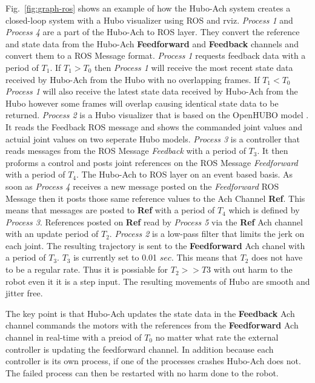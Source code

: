 Fig.~\ref{fig:graph-ros} shows an example of how the Hubo-Ach system creates a closed-loop system with a Hubo visualizer using ROS and rviz.
\textit{Process 1} and \textit{Process 4} are a part of the Hubo-Ach to ROS layer.
They convert the reference and state data from the Hubo-Ach \textbf{Feedforward} and \textbf{Feedback} channels and convert them to a ROS Message format.
\textit{Process 1} requests feedback data with a period of $T_1$.
If $T_1>T_0$ then \textit{Process 1} will receive the most recent state data received by Hubo-Ach from the Hubo with no overlapping frames.
If $T_1<T_0$ \textit{Process 1} will also receive the latest state data received by Hubo-Ach from the Hubo however some frames will overlap causing identical state data to be returned.
\textit{Process 2} is a Hubo visualizer that is based on the OpenHUBO model \cite{jaemiHuboSRM}.
It reads the Feedback ROS message and shows the commanded joint values and actuial joint values on two seperate Hubo models.
\textit{Process 3} is a controller that reads messages from the ROS Message \textit{Feedback} with a period of $T_3$.
It then proforms a control and posts joint references on the ROS Message \textit{Feedforward} with a period of $T_4$.
The Hubo-Ach to ROS layer on an event based basis. 
As soon as \textit{Process 4} receives a new message posted on the \textit{Feedforward} ROS Message then it posts those same reference values to the Ach Channel \textbf{Ref}.
This means that messages are posted to \textbf{Ref} with a period of $T_4$ which is defined by \textit{Process 3}.
References posted on \textbf{Ref} read by \textit{Process 5} via the \textbf{Ref} Ach channel with an update period of $T_2$.
\textit{Process 2} is a low-pass filter that limits the jerk on each joint.
The resulting trajectory is sent to the \textbf{Feedforward} Ach chanel with a period of $T_3$.
$T_3$ is currently set to 0.01 $sec$.
This means that $T_2$ does not have to be a regular rate.
Thus it is possiable for $T_2>>T3$ with out harm to the robot even it it is a step input.
The resulting movements of Hubo are smooth and jitter free.

The key point is that Hubo-Ach updates the state data in the \textbf{Feedback} Ach channel commands the motors with the references from the \textbf{Feedforward} Ach channel in real-time with a preiod of $T_0$ no matter what rate the external controller is updating the feedforward channel.  
In addition because each controller is its own process, if one of the processes crashes Hubo-Ach does not.
The failed process can then be restarted with no harm done to the robot.




